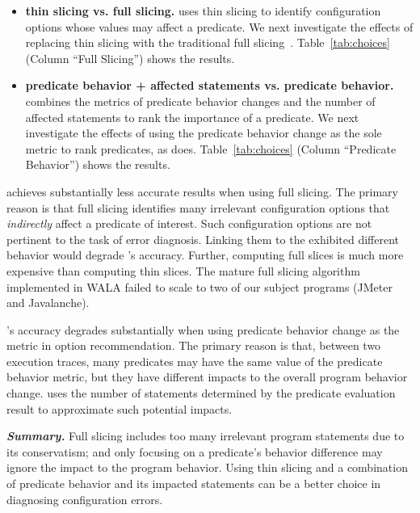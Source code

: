 \begin{itemize}
\item \textbf{thin slicing vs. full slicing.} \ourtool
uses thin slicing to identify configuration options
whose values may affect a predicate. We next investigate
the effects of replacing thin slicing with
the traditional full slicing~\cite{Horwitz:1988}.
Table~\ref{tab:choices} (Column ``Full Slicing'') shows the results.

\item \textbf{predicate behavior + affected statements vs. predicate behavior.}
\ourtool combines the metrics of predicate behavior changes
and the number of affected statements to rank the importance
of a predicate. We next
investigate the effects of using the 
predicate behavior change as the sole metric to rank predicates, as \prevtool does.
Table~\ref{tab:choices} (Column ``Predicate Behavior'') shows
the results. 
\end{itemize}

\ourtool achieves substantially less accurate results when
using full slicing. The primary reason is that full slicing
identifies many irrelevant configuration options that \textit{indirectly}
affect a predicate of interest. Such configuration options
are not pertinent to the task of error diagnosis. Linking them
to the exhibited different behavior would degrade
\ourtool's accuracy. Further, computing full slices is much
more expensive than computing thin slices. The mature
full slicing algorithm implemented in WALA failed to scale
to two of our subject programs (JMeter and Javalanche).


\ourtool's accuracy degrades substantially when using
predicate behavior change as the metric in option
recommendation. The primary reason is that, between two execution traces,
many predicates may have the same value of the predicate
behavior metric, but they have different
impacts to the overall program behavior change. \ourtool
uses the number of statements determined by the predicate
evaluation result to approximate such potential impacts.


\vspace{1mm}
\noindent \textbf{\textit{Summary.}} Full slicing
includes too many irrelevant program statements due to its
conservatism; and only focusing on a predicate's behavior
difference
may ignore the impact to the program behavior. 
Using thin slicing and a combination of predicate behavior
and its impacted statements can be a better choice in diagnosing
configuration errors.

